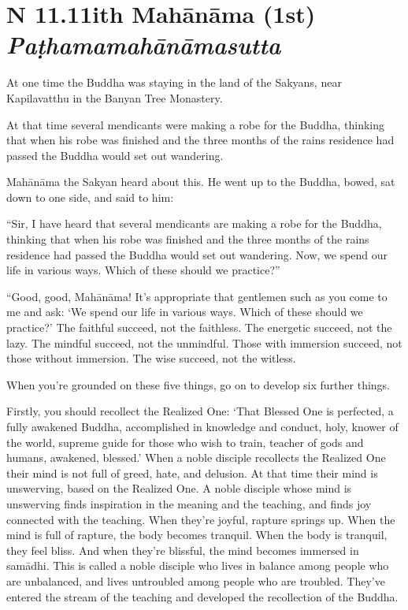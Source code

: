 \documentclass[12pt,openany]{book}%
\newcommand*{\suttatitleacronym}[1]{\smaller[2]{#1}\vspace*{.3em}}
\newcommand*{\suttatitletranslation}[1]{\linebreak{#1}}
\newcommand*{\suttatitleroot}[1]{\linebreak\smaller[2]\itshape{#1}}
\newcommand*{\tocacronym}[1]{\hspace*{-3.3em}{#1}\quad}
\newcommand*{\toctranslation}[1]{#1}
\newcommand*{\tocroot}[1]{(\textit{#1})}
\begin{document}
%
\section*{{\suttatitleacronym AN 11.11}{\suttatitletranslation With Mahānāma (1st) }{\suttatitleroot Paṭhamamahānāmasutta}}
\addcontentsline{toc}{section}{\tocacronym{AN 11.11} \toctranslation{With Mahānāma (1st) } \tocroot{Paṭhamamahānāmasutta}}

At one time the Buddha was staying in the land of the Sakyans, near Kapilavatthu in the Banyan Tree Monastery. 

At that time several mendicants were making a robe for the Buddha, thinking that when his robe was finished and the three months of the rains residence had passed the Buddha would set out wandering. 

\textsanskrit{Mahānāma} the Sakyan heard about this. He went up to the Buddha, bowed, sat down to one side, and said to him: 

“Sir, I have heard that several mendicants are making a robe for the Buddha, thinking that when his robe was finished and the three months of the rains residence had passed the Buddha would set out wandering. Now, we spend our life in various ways. Which of these should we practice?” 

“Good, good, \textsanskrit{Mahānāma}! It’s appropriate that gentlemen such as you come to me and ask: ‘We spend our life in various ways. Which of these should we practice?’ The faithful succeed, not the faithless. The energetic succeed, not the lazy. The mindful succeed, not the unmindful. Those with immersion succeed, not those without immersion. The wise succeed, not the witless. 

When you’re grounded on these five things, go on to develop six further things. 

Firstly, you should recollect the Realized One: ‘That Blessed One is perfected, a fully awakened Buddha, accomplished in knowledge and conduct, holy, knower of the world, supreme guide for those who wish to train, teacher of gods and humans, awakened, blessed.’ When a noble disciple recollects the Realized One their mind is not full of greed, hate, and delusion. At that time their mind is unswerving, based on the Realized One. A noble disciple whose mind is unswerving finds inspiration in the meaning and the teaching, and finds joy connected with the teaching. When they’re joyful, rapture springs up. When the mind is full of rapture, the body becomes tranquil. When the body is tranquil, they feel bliss. And when they’re blissful, the mind becomes immersed in \textsanskrit{samādhi}. This is called a noble disciple who lives in balance among people who are unbalanced, and lives untroubled among people who are troubled. They’ve entered the stream of the teaching and developed the recollection of the Buddha. 
\end{document}
